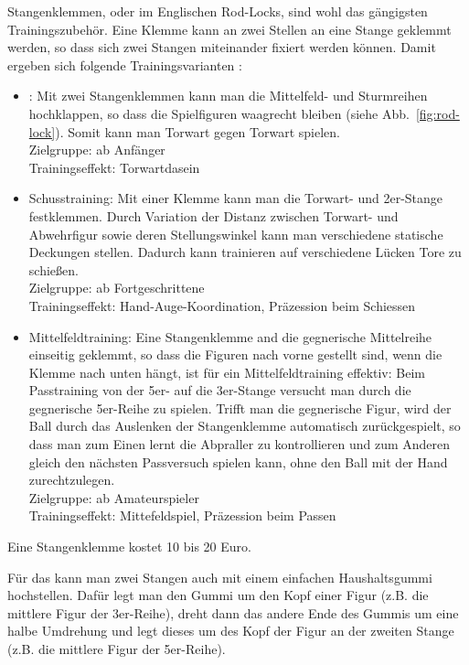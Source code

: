 Stangenklemmen, oder im Englischen Rod-Locks, sind wohl das gängigsten Trainingszubehör. 
Eine Klemme kann an zwei Stellen an eine Stange geklemmt werden, so dass sich zwei Stangen miteinander fixiert werden können. 
Damit ergeben sich folgende Trainingsvarianten \citep{www:rod-lock}:
\begin{itemize}
\item {}: Mit zwei Stangenklemmen kann man die Mittelfeld- und Sturmreihen hochklappen, so dass die Spielfiguren waagrecht bleiben (siehe Abb.~\ref{fig:rod-lock}). 
Somit kann man Torwart gegen Torwart spielen. 
\\
Zielgruppe: ab Anfänger
\\
Trainingseffekt: Torwartdasein
\item Schusstraining: Mit einer Klemme kann man die Torwart- und 2er-Stange festklemmen. 
Durch Variation der Distanz zwischen Torwart- und Abwehrfigur sowie deren Stellungswinkel kann man verschiedene statische Deckungen stellen.
Dadurch kann trainieren auf verschiedene Lücken Tore zu schießen.  
\\
Zielgruppe: ab Fortgeschrittene
\\
Trainingseffekt: Hand-Auge-Koordination, Präzession beim Schiessen
\item Mittelfeldtraining: Eine Stangenklemme and die gegnerische Mittelreihe einseitig geklemmt, so dass die Figuren nach vorne gestellt sind, wenn die Klemme nach unten hängt, ist für ein Mittelfeldtraining effektiv:
Beim Passtraining von der 5er- auf die 3er-Stange versucht man durch die gegnerische 5er-Reihe zu spielen. 
Trifft man die gegnerische Figur, wird der Ball durch das Auslenken der Stangenklemme automatisch zurückgespielt, so dass man zum Einen lernt die Abpraller zu kontrollieren und zum Anderen gleich den nächsten Passversuch spielen kann, ohne den Ball mit der Hand zurechtzulegen.
\\
Zielgruppe: ab Amateurspieler
\\
Trainingseffekt: Mittefeldspiel, Präzession beim Passen
\end{itemize}
Eine Stangenklemme kostet 10 bis 20 Euro.

Für das  kann man zwei Stangen auch mit einem einfachen Haushaltsgummi hochstellen.
Dafür legt man den Gummi um den Kopf einer Figur (z.B. die mittlere Figur der 3er-Reihe), dreht dann das andere Ende des Gummis um eine halbe Umdrehung und legt dieses um des Kopf der Figur an der zweiten Stange (z.B. die mittlere Figur der 5er-Reihe). 

